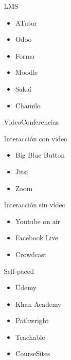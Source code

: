 \documentclass[aspectratio=169]{beamer}
\begin{document}
\begin{frame}[fragile]{LMS}
    
    \begin{itemize}
        \item ATutor
        \item Odoo
        \item Forma
        \item Moodle 
        \item Sakai
        \item Chamilo
    \end{itemize}
\end{frame}

\begin{frame}[fragile]{VideoConferencias}
    
    Interacción con video
    \begin{itemize}
        \item Big Blue Button
        \item Jitsi
        \item Zoom
    \end{itemize}

Interacción sin vídeo
    \begin{itemize}
    \item Youtube on air
    \item Facebook Live
    \item Crowdcast
\end{itemize}
\end{frame}

\begin{frame}[fragile]{Self-paced}
    
    \begin{itemize}
        \item Udemy
        \item Khan Academy
        \item Pathwright
        \item Teachable
        \item CourseSites
    \end{itemize}
    
\end{frame}
\end{document}
